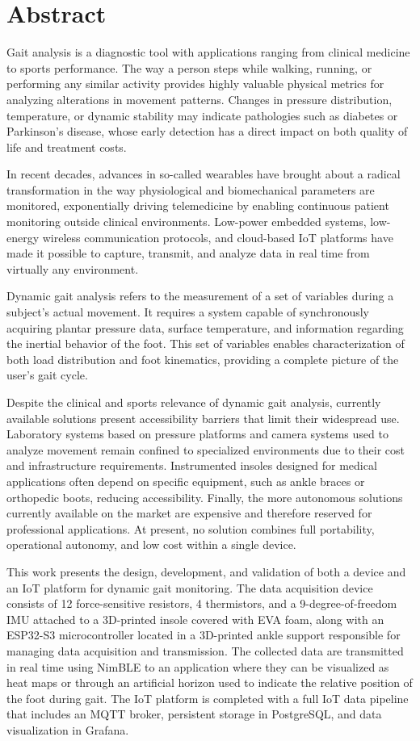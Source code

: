 \chapter*{Abstract}
Gait analysis is a diagnostic tool with applications ranging from clinical medicine to sports performance. The way a person steps while walking, running, or performing any similar activity provides highly valuable physical metrics for analyzing alterations in movement patterns. Changes in pressure distribution, temperature, or dynamic stability may indicate pathologies such as diabetes or Parkinson’s disease, whose early detection has a direct impact on both quality of life and treatment costs.

In recent decades, advances in so-called wearables have brought about a radical transformation in the way physiological and biomechanical parameters are monitored, exponentially driving telemedicine by enabling continuous patient monitoring outside clinical environments. Low-power embedded systems, low-energy wireless communication protocols, and cloud-based IoT platforms have made it possible to capture, transmit, and analyze data in real time from virtually any environment.

Dynamic gait analysis refers to the measurement of a set of variables during a subject’s actual movement. It requires a system capable of synchronously acquiring plantar pressure data, surface temperature, and information regarding the inertial behavior of the foot. This set of variables enables characterization of both load distribution and foot kinematics, providing a complete picture of the user’s gait cycle.

Despite the clinical and sports relevance of dynamic gait analysis, currently available solutions present accessibility barriers that limit their widespread use. Laboratory systems based on pressure platforms and camera systems used to analyze movement remain confined to specialized environments due to their cost and infrastructure requirements. Instrumented insoles designed for medical applications often depend on specific equipment, such as ankle braces or orthopedic boots, reducing accessibility. Finally, the more autonomous solutions currently available on the market are expensive and therefore reserved for professional applications. At present, no solution combines full portability, operational autonomy, and low cost within a single device.

This work presents the design, development, and validation of both a device and an IoT platform for dynamic gait monitoring. The data acquisition device consists of 12 force-sensitive resistors, 4 thermistors, and a 9-degree-of-freedom IMU attached to a 3D-printed insole covered with EVA foam, along with an ESP32-S3 microcontroller located in a 3D-printed ankle support responsible for managing data acquisition and transmission. The collected data are transmitted in real time using NimBLE to an application where they can be visualized as heat maps or through an artificial horizon used to indicate the relative position of the foot during gait. The IoT platform is completed with a full IoT data pipeline that includes an MQTT broker, persistent storage in PostgreSQL, and data visualization in Grafana.

